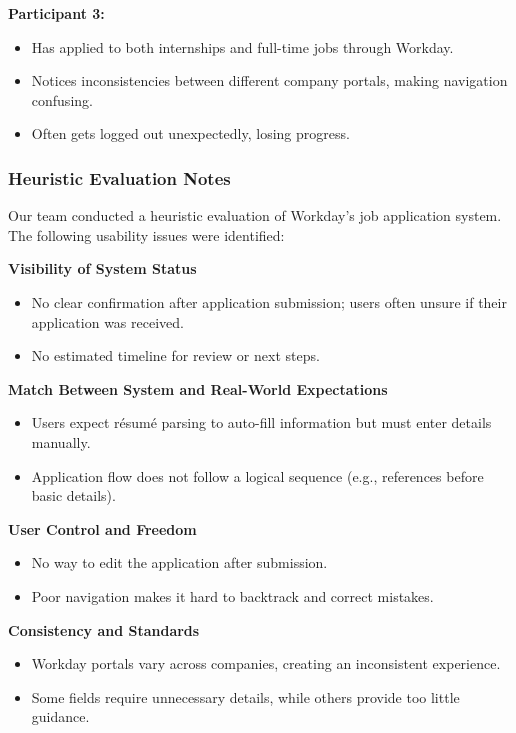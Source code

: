 \documentclass[
	letterpaper, %
]{jdf}
\begin{document}
\begin{sloppypar}
\textbf{Participant 3:}  
\begin{itemize}  
    \item Has applied to both internships and full-time jobs through Workday.  
    \item Notices inconsistencies between different company portals, making navigation confusing.  
    \item Often gets logged out unexpectedly, losing progress.  
\end{itemize}  
\hfill \break  

\subsubsection*{Heuristic Evaluation Notes}  

Our team conducted a heuristic evaluation of Workday’s job application system. The following usability issues were identified:   

\textbf{Visibility of System Status}  
\begin{itemize}  
    \item No clear confirmation after application submission; users often unsure if their application was received.  
    \item No estimated timeline for review or next steps.  
\end{itemize}   

\textbf{Match Between System and Real-World Expectations}  
\begin{itemize}  
    \item Users expect résumé parsing to auto-fill information but must enter details manually.  
    \item Application flow does not follow a logical sequence (e.g., references before basic details).  
\end{itemize}  


\textbf{User Control and Freedom}  
\begin{itemize}  
    \item No way to edit the application after submission.  
    \item Poor navigation makes it hard to backtrack and correct mistakes.  
\end{itemize}   

\textbf{Consistency and Standards}  
\begin{itemize}  
    \item Workday portals vary across companies, creating an inconsistent experience.  
    \item Some fields require unnecessary details, while others provide too little guidance.  
\end{itemize}  


\end{sloppypar}
\end{document}
